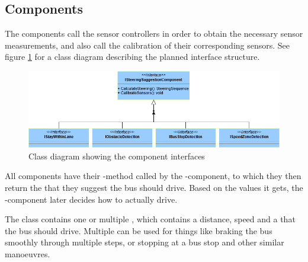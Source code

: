 \subsection{Components}
The components call the sensor controllers in order to obtain the necessary sensor measurements, and also call the calibration of their corresponding sensors. See figure \ref{fig:interfaceComponents} for a class diagram describing the planned interface structure.

\begin{figure}[ht]
    \includegraphics[width=\textwidth]{Images/Design/InterfaceComponents.png}
    \caption{Class diagram showing the component interfaces}
    \label{fig:interfaceComponents}
\end{figure}

All components have their -method called by the -component, to which they then return the  that they suggest the bus should drive. Based on the values it gets, the -component later decides how to actually drive. 

The class  contains one or multiple , which contains a distance, speed and a  that the bus should drive. Multiple  can be used for things like braking the bus smoothly through multiple steps, or stopping at a bus stop and other similar manoeuvres. 





